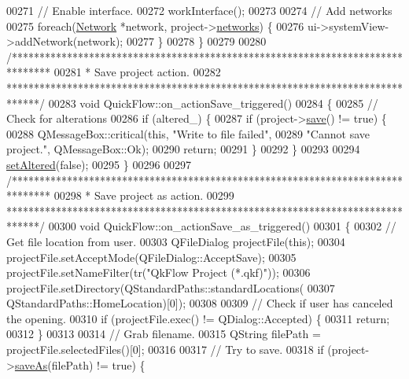 \begin{DoxyCode}
00271   \textcolor{comment}{// Enable interface.}
00272   workInterface();
00273 
00274   \textcolor{comment}{// Add networks}
00275   \textcolor{keywordflow}{foreach}(\hyperlink{class_network}{Network} *network, project->\hyperlink{class_project_a28c99cc1f0568fbc6f2428894acf3c3a}{networks}) \{
00276     ui->systemView->addNetwork(network);
00277   \}
00278 \}
00279 
00280 \textcolor{comment}{/*******************************************************************************}
00281 \textcolor{comment}{ * Save project action.}
00282 \textcolor{comment}{ ******************************************************************************/}
00283 \textcolor{keywordtype}{void} QuickFlow::on\_actionSave\_triggered()
00284 \{
00285   \textcolor{comment}{// Check for alterations}
00286   \textcolor{keywordflow}{if} (altered\_) \{
00287     \textcolor{keywordflow}{if} (project->\hyperlink{class_project_a596a875bc5be73bc5b1b71b6448c1e07}{save}() != \textcolor{keyword}{true}) \{
00288       QMessageBox::critical(\textcolor{keyword}{this}, \textcolor{stringliteral}{"Write to file failed"},
00289                             \textcolor{stringliteral}{"Cannot save project."}, QMessageBox::Ok);
00290       \textcolor{keywordflow}{return};
00291     \}
00292   \}
00293 
00294   \hyperlink{group___window_ga4b63ea5ca52a9eea14db0a22b5a133f8}{setAltered}(\textcolor{keyword}{false});
00295 \}
00296 
00297 \textcolor{comment}{/*******************************************************************************}
00298 \textcolor{comment}{ * Save project as action.}
00299 \textcolor{comment}{ ******************************************************************************/}
00300 \textcolor{keywordtype}{void} QuickFlow::on\_actionSave\_as\_triggered()
00301 \{
00302   \textcolor{comment}{// Get file location from user.}
00303   QFileDialog projectFile(\textcolor{keyword}{this});
00304   projectFile.setAcceptMode(QFileDialog::AcceptSave);
00305   projectFile.setNameFilter(tr(\textcolor{stringliteral}{"QkFlow Project (*.qkf)"}));
00306   projectFile.setDirectory(QStandardPaths::standardLocations(
00307                              QStandardPaths::HomeLocation)[0]);
00308 
00309   \textcolor{comment}{// Check if user has canceled the opening.}
00310   \textcolor{keywordflow}{if} (projectFile.exec() != QDialog::Accepted) \{
00311     \textcolor{keywordflow}{return};
00312   \}
00313 
00314   \textcolor{comment}{// Grab filename.}
00315   QString filePath = projectFile.selectedFiles()[0];
00316 
00317   \textcolor{comment}{// Try to save.}
00318   \textcolor{keywordflow}{if} (project->\hyperlink{class_project_ad32a31d548ad38f4cbbe0f95879a68e5}{saveAs}(filePath) != \textcolor{keyword}{true}) \{

\end{DoxyCode}

